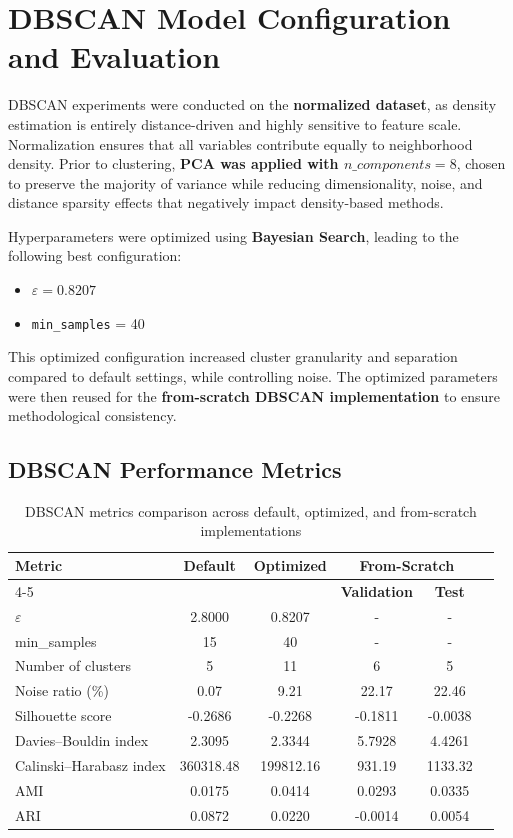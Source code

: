 \section{DBSCAN Model Configuration and Evaluation}

DBSCAN experiments were conducted on the \textbf{normalized dataset}, as density estimation is entirely distance-driven and highly sensitive to feature scale. Normalization ensures that all variables contribute equally to neighborhood density. Prior to clustering, \textbf{PCA was applied with $n\_components = 8$}, chosen to preserve the majority of variance while reducing dimensionality, noise, and distance sparsity effects that negatively impact density-based methods.

Hyperparameters were optimized using \textbf{Bayesian Search}, leading to the following best configuration:
\begin{itemize}
    \item $\varepsilon = 0.8207$
    \item \texttt{min\_samples} = 40
\end{itemize}

This optimized configuration increased cluster granularity and separation compared to default settings, while controlling noise. The optimized parameters were then reused for the \textbf{from-scratch DBSCAN implementation} to ensure methodological consistency.

\subsection{DBSCAN Performance Metrics}

\begin{table}[H]
\centering
\caption{DBSCAN metrics comparison across default, optimized, and from-scratch implementations}
\begin{tabular}{lccccc}
\hline
\textbf{Metric} & \textbf{Default} & \textbf{Optimized} & \multicolumn{2}{c}{\textbf{From-Scratch}} \\
\cline{4-5}
& & & \textbf{Validation} & \textbf{Test} \\
\hline
$\varepsilon$              & 2.8000 & 0.8207 & - & - \\
min\_samples               & 15     & 40     & - & - \\
Number of clusters         & 5      & 11     & 6 & 5 \\
Noise ratio (\%)           & 0.07   & 9.21   & 22.17 & 22.46 \\
Silhouette score           & -0.2686 & -0.2268 & -0.1811 & -0.0038 \\
Davies--Bouldin index      & 2.3095 & 2.3344 & 5.7928 & 4.4261 \\
Calinski--Harabasz index   & 360318.48 & 199812.16 & 931.19 & 1133.32 \\
AMI                        & 0.0175 & 0.0414 & 0.0293 & 0.0335 \\
ARI                        & 0.0872 & 0.0220 & -0.0014 & 0.0054 \\
\hline
\end{tabular}
\end{table}

